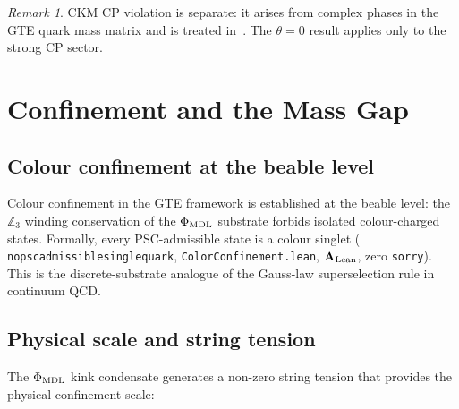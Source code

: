 \documentclass[11pt]{article}
\theoremstyle{remark}
\newtheorem{remark}[theorem]{Remark}
\newcommand{\ZZ}{\mathbb{Z}}
\newcommand{\phimdl}{\Phi_{\rm MDL}}
\newcommand{\lean}[1]{%
  \penalty-100
  \begingroup\def\_{\textunderscore\allowbreak}\texttt{#1}\endgroup}
\newcommand{\CatAL}{\ensuremath{\textbf{A}_{\rm Lean}}}
\begin{document}
\begin{remark}
CKM CP violation is separate: it arises from complex phases in the GTE quark
mass matrix and is treated in~\cite{SpivackCKM,SpivackDeeperConsequences}.
The $\theta = 0$ result applies only to the strong CP sector.
\end{remark}

\section{Confinement and the Mass Gap}
\label{sec:confinement}

\subsection{Colour confinement at the beable level}
\label{ssec:confbeable}

Colour confinement in the GTE framework is established at the beable level:
the $\ZZ_3$ winding conservation of the $\phimdl$ substrate forbids isolated
colour-charged states.
Formally, every PSC-admissible state is a colour singlet
(\lean{no\_psc\_admissible\_single\_quark},
\lean{ColorConfinement.lean}, \CatAL{}, zero \texttt{sorry}).
This is the discrete-substrate analogue of the Gauss-law superselection rule
in continuum QCD.

\subsection{Physical scale and string tension}
\label{ssec:stringtension}

The $\phimdl$ kink condensate generates a non-zero string tension that provides
the physical confinement scale:
\end{document}
